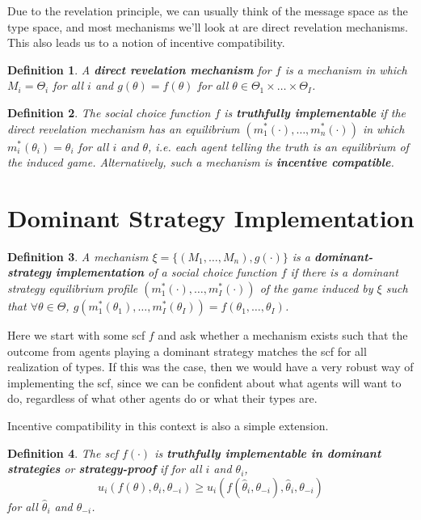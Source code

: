 \documentclass[letter, 10pt]{article}
\theoremstyle{basic}
\newtheorem{definition}{Definition}[section]
\begin{document}
\begin{spacing}{1.0}
Due to the revelation principle, we can usually think of
the message space as the type space, and most mechanisms
we'll look at are direct revelation mechanisms. This also
leads us to a notion of incentive compatibility.

\begin{definition}
  A \textbf{direct revelation mechanism} for $f$ is a mechanism
  in which $M_i = \Theta_i$ for all $i$ and $g(\theta) =
  f(\theta)$ for all $\theta \in \Theta_1 \times \ldots
  \times \Theta_I$.
\end{definition}

\begin{definition}
  The social choice function $f$ is \textbf{truthfully
    implementable} if the direct revelation mechanism has
  an equilibrium $(m_1^*(\cdot), \ldots, m_n^*(\cdot))$
  in which $m_i^*(\theta_i) = \theta_i$ for all $i$ and
  $\theta$, i.e. each agent telling the truth is an
  equilibrium of the induced game. Alternatively, such a
  mechanism is \textbf{incentive compatible}.
\end{definition}

\section{Dominant Strategy Implementation}
\label{sec:domin-strat-impl}

\begin{definition}
  A mechanism $\xi = \{(M_1, \ldots, M_n),
  g(\cdot)\}$ is a \textbf{dominant-strategy
    implementation} of a social choice function $f$ if
  there is a dominant strategy equilibrium profile
  $(m_1^*(\cdot), \ldots, m_I^*(\cdot))$ of the game
  induced by $\xi$ such that $\forall \theta \in \Theta$,
  $g(m_1^*(\theta_1), \ldots, m_I^*(\theta_I)) =
  f(\theta_1, \ldots, \theta_I)$.
\end{definition}

Here we start with some scf $f$ and ask whether a mechanism exists such
that the outcome from agents playing a dominant strategy matches the scf
for all realization of types. If this was the case, then we would have a
very robust way of implementing the scf, since we can be confident about
what agents will want to do, regardless of what other agents do or what their types are.

\hspace{1em}
Incentive compatibility in this context is also a simple
extension.
\begin{definition}\label{IC}
  The scf $f(\cdot)$ is \textbf{truthfully implementable in dominant
  strategies} or \textbf{strategy-proof} if for all $i$ and $\theta_i$, \[u_i(f(\theta),\theta_i, \theta_{-i})
  \geq u_i(f(\hat{\theta}_i, \theta_{-i}),
  \hat{\theta}_i, \theta_{-i})\] for all $\hat{\theta}_i$
  and $\theta_{-i}$.
\end{definition}


\end{spacing}
\end{document}
